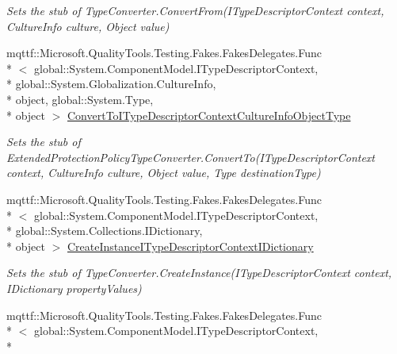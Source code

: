 \begin{DoxyCompactItemize}
\begin{DoxyCompactList}\small\item\em Sets the stub of Type\-Converter.\-Convert\-From(\-I\-Type\-Descriptor\-Context context, Culture\-Info culture, Object value)\end{DoxyCompactList}\item 
mqttf\-::\-Microsoft.\-Quality\-Tools.\-Testing.\-Fakes.\-Fakes\-Delegates.\-Func\\*
$<$ global\-::\-System.\-Component\-Model.\-I\-Type\-Descriptor\-Context, \\*
global\-::\-System.\-Globalization.\-Culture\-Info, \\*
object, global\-::\-System.\-Type, \\*
object $>$ \hyperlink{class_system_1_1_security_1_1_authentication_1_1_extended_protection_1_1_fakes_1_1_stub_extendedf67afed15bbc0df07bfc91316f6f81f0_ac49540b970495af47fcd11fb70fee8f4}{Convert\-To\-I\-Type\-Descriptor\-Context\-Culture\-Info\-Object\-Type}
\begin{DoxyCompactList}\small\item\em Sets the stub of Extended\-Protection\-Policy\-Type\-Converter.\-Convert\-To(\-I\-Type\-Descriptor\-Context context, Culture\-Info culture, Object value, Type destination\-Type)\end{DoxyCompactList}\item 
mqttf\-::\-Microsoft.\-Quality\-Tools.\-Testing.\-Fakes.\-Fakes\-Delegates.\-Func\\*
$<$ global\-::\-System.\-Component\-Model.\-I\-Type\-Descriptor\-Context, \\*
global\-::\-System.\-Collections.\-I\-Dictionary, \\*
object $>$ \hyperlink{class_system_1_1_security_1_1_authentication_1_1_extended_protection_1_1_fakes_1_1_stub_extendedf67afed15bbc0df07bfc91316f6f81f0_a42c68b29bee139569ee9eb09f525d6ce}{Create\-Instance\-I\-Type\-Descriptor\-Context\-I\-Dictionary}
\begin{DoxyCompactList}\small\item\em Sets the stub of Type\-Converter.\-Create\-Instance(\-I\-Type\-Descriptor\-Context context, I\-Dictionary property\-Values)\end{DoxyCompactList}\item 
mqttf\-::\-Microsoft.\-Quality\-Tools.\-Testing.\-Fakes.\-Fakes\-Delegates.\-Func\\*
$<$ global\-::\-System.\-Component\-Model.\-I\-Type\-Descriptor\-Context, \\*

\end{DoxyCompactItemize}
